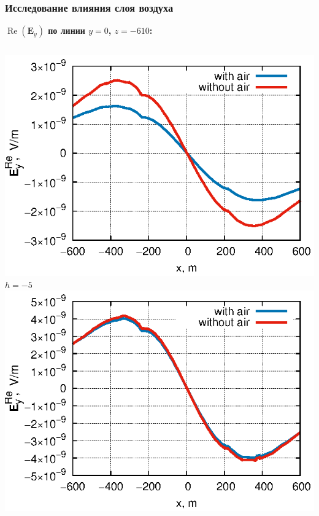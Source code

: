 \documentclass[aspectratio=43]{beamer}
\renewcommand{\Re}{\mathop{\mathrm{Re}}\nolimits}
\newcommand{\MakeTitle}[1]{\frametitle{\hspace{1.5em}\textbf{#1} \hfill \insertframenumber{} }}
\begin{document}
\begin{frame}
	\MakeTitle{Исследование влияния слоя воздуха}
	\textbf{$\Re(\mathbf{E}_y)$ по линии $y=0$, $z=-610$:}
	\begin{columns}[t,totalwidth=\linewidth]
		\begin{column}{.5\linewidth}
			\vspace{-1.7em}
			\begin{center}
			\includegraphics[width=\textwidth,height=0.4\textheight,keepaspectratio]{deep_-5.eps} \\
			\vspace{-0.1em}
			\tiny{$h=-5$} \\
			\includegraphics[width=\textwidth,height=0.4\textheight,keepaspectratio]{deep_-200.eps} \\
			\vspace{-0.1em}

\end{center}
\end{column}
\end{columns}
\end{frame}
\end{document}
